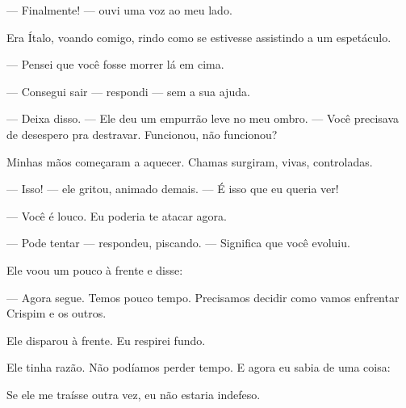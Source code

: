 — Finalmente! — ouvi uma voz ao meu lado.

Era Ítalo, voando comigo, rindo como se estivesse assistindo a um espetáculo.

— Pensei que você fosse morrer lá em cima.

— Consegui sair — respondi — sem a sua ajuda.

— Deixa disso. — Ele deu um empurrão leve no meu ombro. — Você precisava de desespero pra destravar. Funcionou, não funcionou?

Minhas mãos começaram a aquecer.  
Chamas surgiram, vivas, controladas.

— Isso! — ele gritou, animado demais. — É isso que eu queria ver!

— Você é louco. Eu poderia te atacar agora.

— Pode tentar — respondeu, piscando. — Significa que você evoluiu.

Ele voou um pouco à frente e disse:

— Agora segue. Temos pouco tempo.  
Precisamos decidir como vamos enfrentar Crispim e os outros.

Ele disparou à frente.  
Eu respirei fundo.

Ele tinha razão.  
Não podíamos perder tempo.  
E agora eu sabia de uma coisa:

Se ele me traísse outra vez, eu não estaria indefeso.
